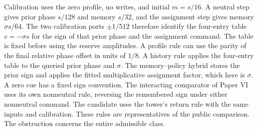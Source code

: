 \documentclass[11pt,a4paper]{article}
\theoremstyle{definition}
\begin{document}
Calibration uses the zero profile, no writes, and initial $m=s/16$. A neutral step gives prior phase $s/128$ and memory $s/32$, and the assignment step gives memory $\sigma s/64$. The two calibration ports $\pm1/512$ therefore identify the four-entry table $v=-\sigma s$ for the sign of that prior phase and the assignment command. The table is fixed before using the reserve amplitudes. A profile rule can use the parity of the final relative phase offset in units of $1/8$. A history rule applies the four-entry table to the queried prior phase and $\sigma$. The memory--policy hybrid stores the prior sign and applies the fitted multiplicative assignment factor, which here is $\sigma$. A zero cue has a fixed sign convention. The interacting comparator of Paper VI \cite{paper6} uses its own nonneutral rule, reversing the remembered sign under either nonneutral command. The candidate uses the tower's return rule with the same inputs and calibration. These rules are representatives of the public comparison. The obstruction concerns the entire admissible class.
\end{document}
